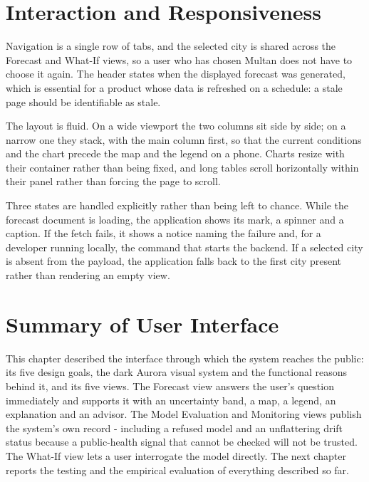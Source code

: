 \section{Interaction and Responsiveness}
Navigation is a single row of tabs, and the selected city is shared across the
Forecast and What-If views, so a user who has chosen Multan does not have to
choose it again. The header states when the displayed forecast was generated,
which is essential for a product whose data is refreshed on a schedule: a stale
page should be identifiable as stale.

The layout is fluid. On a wide viewport the two columns sit side by side; on a
narrow one they stack, with the main column first, so that the current conditions
and the chart precede the map and the legend on a phone. Charts resize with their
container rather than being fixed, and long tables scroll horizontally within
their panel rather than forcing the page to scroll.

Three states are handled explicitly rather than being left to chance. While the
forecast document is loading, the application shows its mark, a spinner and a
caption. If the fetch fails, it shows a notice naming the failure and, for a
developer running locally, the command that starts the backend. If a selected city
is absent from the payload, the application falls back to the first city present
rather than rendering an empty view.

\section{Summary of User Interface}
This chapter described the interface through which the system reaches the public:
its five design goals, the dark Aurora visual system and the functional reasons
behind it, and its five views. The Forecast view answers the user's question
immediately and supports it with an uncertainty band, a map, a legend, an
explanation and an advisor. The Model Evaluation and Monitoring views publish the
system's own record - including a refused model and an unflattering drift status
because a public-health signal that cannot be checked will not be trusted. The
What-If view lets a user interrogate the model directly. The next chapter reports
the testing and the empirical evaluation of everything described so far.
